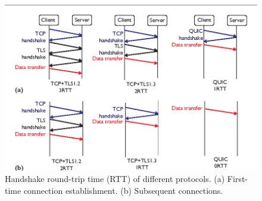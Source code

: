 \begin{frame}
    
    \begin{figure}[!ht]
        \centering
        \includegraphics[width=1\textwidth]
        {figures/0rtt.png}
        \endminipage\hfill
        \caption{\label{fig:RTT} Handshake round-trip time (RTT) of different protocols. (a) First-time connection establishment. (b) Subsequent connections.\cite{Cui2017}}
    \end{figure}

    
    
\end{frame}
\clearpage


